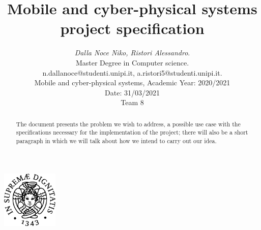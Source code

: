 \documentclass[12pt, letterpaper]{article}  %
\title{\vspace{-2cm}\textbf{Mobile and cyber-physical systems project specification}}
\author{\small{\textit{Dalla Noce Niko, Ristori Alessandro}.} \\ %
        \small{Master Degree in Computer science.}\\ \small{{n.dallanoce@studenti.unipi.it, a.ristori5@studenti.unipi.it}.} \\  %
        \small{Mobile and cyber-physical systems, Academic Year: 2020/2021} \\
        \small{Date: 31/03/2021} \\
        \small{Team 8}
}
\begin{document}
\nocite{*}  %
\date{}
\maketitle
\begin{center}
    \includegraphics[width=0.2\textwidth]{images/unipi.png}\\
    \vspace{0.5cm}
\end{center}
\begin{abstract}
The document presents the problem we wish to address, a possible use case with the specifications necessary for the implementation of the project; there will also be a short paragraph in which we will talk about how we intend to carry out our idea.
\end{abstract}
%
\newpage

%
%
%
%
\end{document}
